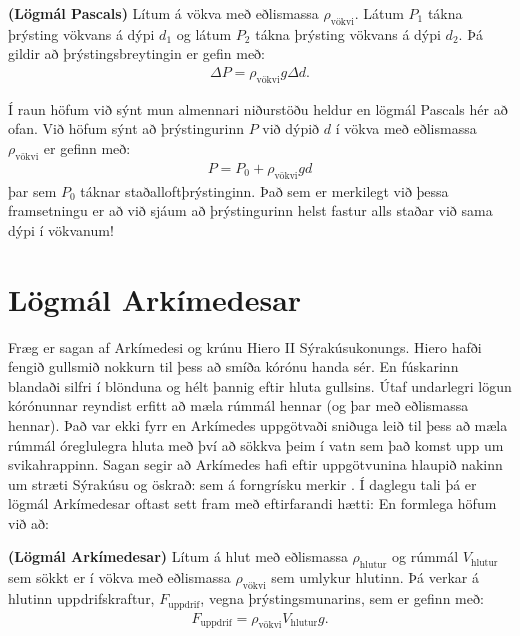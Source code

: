 \ifdefined \wholebook \else\documentclass[oneside]{book}\usepackage{EdlBook}\graphicspath{{figures/}}
\begin{document}
\begin{tcolorbox}
\begin{theorem}
\textbf{(Lögmál Pascals)} Lítum á vökva með eðlismassa $\rho_{\text{vökvi}}$. Látum $P_1$ tákna þrýsting vökvans á dýpi $d_1$ og látum $P_2$ tákna þrýsting vökvans á dýpi $d_2$. Þá gildir að þrýstingsbreytingin er gefin með:
\begin{align*}
    \Delta P = \rho_{\text{vökvi}}g\Delta d.
\end{align*}
\end{theorem}
\end{tcolorbox}

Í raun höfum við sýnt mun almennari niðurstöðu heldur en lögmál Pascals hér að ofan. Við höfum sýnt að þrýstingurinn $P$ við dýpið $d$ í vökva með eðlismassa $\rho_{\text{vökvi}}$ er gefinn með:
\begin{align*}
    P = P_0 + \rho_{\text{vökvi}} g d
\end{align*}
þar sem $P_0$ táknar staðalloftþrýstinginn. Það sem er merkilegt við þessa framsetningu er að við sjáum að þrýstingurinn helst fastur alls staðar við sama dýpi í vökvanum!

\section{Lögmál Arkímedesar}



Fræg er sagan af Arkímedesi og krúnu Hiero II Sýrakúsukonungs. Hiero hafði fengið gullsmið nokkurn til þess að smíða kórónu handa sér. En fúskarinn blandaði silfri í blönduna og hélt þannig eftir hluta gullsins. Útaf undarlegri lögun kórónunnar reyndist erfitt að mæla rúmmál hennar (og þar með eðlismassa hennar). Það var ekki fyrr en Arkímedes uppgötvaði sniðuga leið til þess að mæla rúmmál óreglulegra hluta með því að sökkva þeim í vatn sem það komst upp um svikahrappinn. Sagan segir að Arkímedes hafi eftir uppgötvunina hlaupið nakinn um stræti Sýrakúsu og öskrað:  sem á forngrísku merkir . Í daglegu tali þá er lögmál Arkímedesar oftast sett fram með eftirfarandi hætti:  En formlega höfum við að:

\begin{tcolorbox}
\begin{theorem}
\textbf{(Lögmál Arkímedesar)} Lítum á hlut með eðlismassa $\rho_{\text{hlutur}}$ og rúmmál $V_{\text{hlutur}}$ sem sökkt er í vökva með eðlismassa $\rho_{\text{vökvi}}$ sem umlykur hlutinn. Þá verkar á hlutinn uppdrifskraftur, $F_{\text{uppdrif}}$, vegna þrýstingsmunarins, sem er gefinn með:
\begin{align*}
    F_{\text{uppdrif}} = \rho_{\text{vökvi}}V_{\text{hlutur}}g.
\end{align*}
\end{theorem}
\end{tcolorbox}
\end{document}
